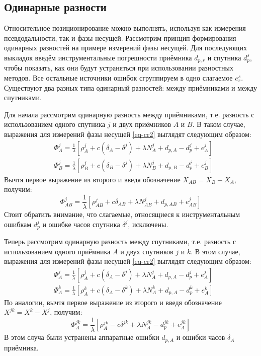 \subsection*{\textbf{Одинарные разности}}

Относительное позиционирование можно выполнять, используя как измерения псевдодальности, так и фазы несущей.
Рассмотрим принцип формирования одинарных разностей на примере измерений фазы несущей.
Для последующих выкладок введём инструментальные погрешности приёмника $d_{p,r}$ и спутника $d_p^s$, чтобы показать, как они будут устраняться при использовании разностных методов.
Все остальные источники ошибок сгруппируем в одно слагаемое $e_r^s$.
Существуют два разных типа одинарный разностей: между приёмниками и между спутниками.

Для начала рассмотрим одинарную разность между приёмниками, т.е. разность с использованием одного спутника $j$ и двух приёмников $A$ и $B$.
В таком случае, выражения для измерений фазы несущей \eqref{eq-cr2} выглядят следующим образом: 
\begin{equation}
\begin{aligned}
&\Phi_A^j=\frac{1}{\lambda}\left[\rho_A^j+c(\delta_A-\delta^j)+\lambda N_A^j+d_{p,A}-d_p^j+e_A^j\right] \\
&\Phi_B^j=\frac{1}{\lambda}\left[\rho_B^j+c(\delta_B-\delta^j)+\lambda N_B^j+d_{p,B}-d_p^j+e_B^j\right] 
\end{aligned}    
\end{equation}
Вычтя первое выражение из второго и введя обозначение $X_{AB}=X_B-X_A$, получим:
\begin{equation}
\label{eq-single-diff}
\Phi_{AB}^j=\frac{1}{\lambda}\left[\rho_{AB}^j+c\delta_{AB}+\lambda N_{AB}^j+d_{p,AB}+e_{AB}^j\right]    
\end{equation}
Стоит обратить внимание, что слагаемые, относящиеся к инструментальным ошибкам $d_p^j$ и ошибке часов спутника $\delta^j$, исключены.

Теперь рассмотрим одинарную разность между спутниками, т.е. разность с использованием одного приёмника $A$ и двух спутников $j$ и $k$.
В этом случае, выражения для измерений фазы несущей \eqref{eq-cr2} выглядят следующим образом: 
\begin{equation}
\begin{aligned}
&\Phi_A^j=\frac{1}{\lambda}\left[\rho_A^j+c(\delta_A-\delta^j)+\lambda N_A^j+d_{p,A}-d_p^j+e_A^j\right] \\
&\Phi_A^k=\frac{1}{\lambda}\left[\rho_A^k+c(\delta_A-\delta^k)+\lambda N_A^k+d_{p,A}-d_p^k+e_A^k\right] 
\end{aligned}    
\end{equation}
По аналогии, вычтя первое выражение из второго и введя обозначение $X^{jk}=X^k-X^j$, получим: 
\begin{equation}
\label{eq-single-diff2}
\Phi_A^{jk}=\frac{1}{\lambda}\left[\rho_A^{jk}-c\delta^{jk}+\lambda N_A^{jk}-d_p^{jk}+e_A^{jk}\right]    
\end{equation}
В этом случа были устранены аппаратные ошибки $d_{p,A}$ и ошибки часов $\delta_A$ приёмника.

